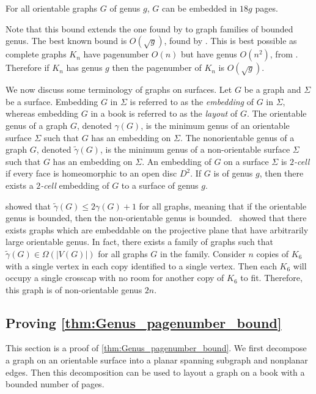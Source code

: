 \begin{theorem}\label{thm:Genus_pagenumber_bound}
	For all orientable graphs \(G\) of genus $g$, $G$ can be embedded in $18g$ pages.
\end{theorem}
Note that this bound extends the one found by \textcite{yannakakisEmbeddingPlanarGraphs1989} to graph families of bounded genus.
The best known bound is \(O(\sqrt{g})\), found by \textcite{malitzGenusGraphsHave1994}. This is best possible as complete graphs $K_n$ have pagenumber $O(n)$ but have genus $O(n^2)$, from \textcite{ringelMapColorTheorem1974}. Therefore if $K_n$ has genus $g$ then the pagenumber of $K_n$ is $O(\sqrt{g})$.

We now discuss some terminology of graphs on surfaces. Let $G$ be a graph and $\Sigma$ be a surface. Embedding $G$ in $\Sigma$ is referred to as the \textit{embedding} of $G$ in $\Sigma$, whereas embedding $G$ in a book is referred to as the \textit{layout} of $G$. The orientable genus of a graph \(G\), denoted \(\gamma(G)\), is the minimum genus of an orientable surface $\Sigma$ such that $G$ has an embedding on $\Sigma$. The nonorientable genus of a graph \(G\), denoted \(\tilde{\gamma}(G)\), is the minimum genus of a non-orientable surface $\Sigma$ such that $G$ has an embedding on $\Sigma$. An embedding of $G$ on a surface $\Sigma$ is \textit{$2$-cell} if every face is homeomorphic to an open disc $D^2$. If $G$ is of genus $g$, then there exists a \textit{$2$-cell} embedding of $G$ to a surface of genus $g$. 


\textcite{moharOrientableGenusGraphs1998} showed that \(\tilde{\gamma}(G) \leq 2 \gamma(G) + 1\) for all graphs, meaning that if the orientable genus is bounded, then the non-orientable genus is bounded.\ \textcite{auslanderImbeddingGraphsManifolds1963} showed that there exists graphs which are embeddable on the projective plane that have arbitrarily large orientable genus. In fact, there exists a family of graphs such that $\tilde{\gamma}(G) \in \Omega(|V(G)|)$ for all graphs $G$ in the family. Consider $n$ copies of $K_6$ with a single vertex in each copy identified to a single vertex. Then each $K_6$ will occupy a single crosscap with no room for another copy of $K_6$ to fit. Therefore, this graph is of non-orientable genus $2n$. 

\subsection{Proving \cref{thm:Genus_pagenumber_bound}}
This section is a proof of \cref{thm:Genus_pagenumber_bound}. We first decompose a graph on an orientable surface into a planar spanning subgraph and nonplanar edges. Then this decomposition can be used to layout a graph on a book with a bounded number of pages.

